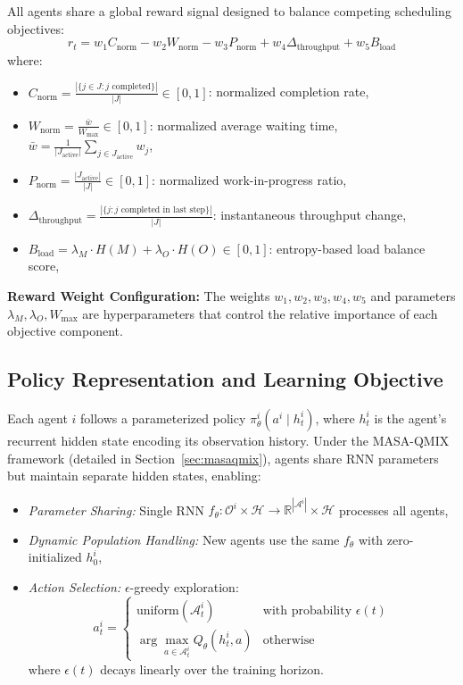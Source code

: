 All agents share a global reward signal designed to balance competing scheduling objectives:
\begin{equation}
r_t = w_1 C_{\text{norm}} - w_2 W_{\text{norm}} - w_3 P_{\text{norm}} + w_4 \Delta_{\text{throughput}} + w_5 B_{\text{load}}
\end{equation}
where:
\begin{itemize}
    \item \( C_{\text{norm}} = \frac{|\{j \in J : j \text{ completed}\}|}{|J|} \in [0,1] \): normalized completion rate,
    \item \( W_{\text{norm}} = \frac{\bar{w}}{W_{\max}} \in [0,1] \): normalized average waiting time, \( \bar{w} = \frac{1}{|J_{\text{active}}|} \sum_{j \in J_{\text{active}}} w_j \),
    \item \( P_{\text{norm}} = \frac{|J_{\text{active}}|}{|J|} \in [0,1] \): normalized work-in-progress ratio,
    \item \( \Delta_{\text{throughput}} = \frac{|\{j : j \text{ completed in last step}\}|}{|J|} \): instantaneous throughput change,
    \item \( B_{\text{load}} = \lambda_M \cdot H(M) + \lambda_O \cdot H(O) \in [0,1] \): entropy-based load balance score,
\end{itemize}

\textbf{Reward Weight Configuration:}
The weights \( w_1, w_2, w_3, w_4, w_5 \) and parameters \( \lambda_M, \lambda_O, W_{\max} \) are hyperparameters that control the relative importance of each objective component.


\subsection{Policy Representation and Learning Objective}

Each agent \( i \) follows a parameterized policy \( \pi_\theta^i(a^i \mid h_t^i) \), where \( h_t^i \) is the agent's recurrent hidden state encoding its observation history. Under the MASA-QMIX framework (detailed in Section~\ref{sec:masaqmix}), agents share RNN parameters but maintain separate hidden states, enabling:
\begin{itemize}
    \item \textit{Parameter Sharing:} Single RNN \( f_\theta: \mathcal{O}^i \times \mathcal{H} \rightarrow \mathbb{R}^{|\mathcal{A}^i|} \times \mathcal{H} \) processes all agents,
    \item \textit{Dynamic Population Handling:} New agents use the same \( f_\theta \) with zero-initialized \( h_0^i \),
    \item \textit{Action Selection:} \( \epsilon \)-greedy exploration:
    \[
    a_t^i = 
    \begin{cases}
    \text{uniform}(\mathcal{A}_t^i) & \text{with probability } \epsilon(t) \\
    \arg\max_{a \in \mathcal{A}_t^i} Q_\theta(h_t^i, a) & \text{otherwise}
    \end{cases}
    \]
    where \( \epsilon(t) \) decays linearly over the training horizon.
\end{itemize}

